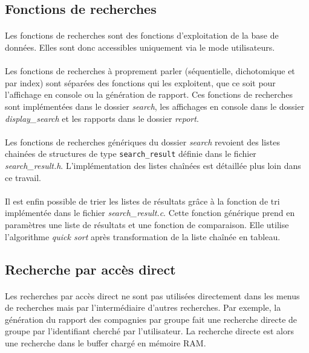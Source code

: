\documentclass{article}
\begin{document}
    \subsection{Fonctions de recherches}
    \paragraph{}
    Les fonctions de recherches sont des fonctions d'exploitation de la base de données. Elles sont donc accessibles uniquement via le mode utilisateurs.

    \paragraph{}
    Les fonctions de recherches à proprement parler (séquentielle, dichotomique et par index) sont séparées des fonctions qui les exploitent, que ce soit pour l'affichage en console ou la génération de rapport. Ces fonctions de recherches sont implémentées dans le dossier \emph{search}, les affichages en console dans le dossier \emph{display\_search} et les rapports dans le dossier \emph{report}.

    \paragraph{}
    Les fonctions de recherches génériques du dossier \emph{search} revoient des listes chainées de structures de type \texttt{search\_result} définie dans le fichier \emph{search\_result.h}. L'implémentation des listes chaînées est détaillée plus loin dans ce travail.

    \paragraph{}
    Il est enfin possible de trier les listes de résultats grâce à la fonction de tri implémentée dans le fichier \emph{search\_result.c}. Cette fonction générique prend en paramètres une liste de résultats et une fonction de comparaison. Elle utilise l'algorithme \emph{quick sort} après transformation de la liste chaînée en tableau.


    \subsection{Recherche par accès direct}
    \paragraph{}
    Les recherches par accès direct ne sont pas utilisées directement dans les menus de recherches mais par l'intermédiaire d'autres recherches. Par exemple, la génération du rapport des compagnies par groupe fait une recherche directe de groupe par l'identifiant cherché par l'utilisateur. La recherche directe est alors une recherche dans le buffer chargé en mémoire RAM.
\end{document}
